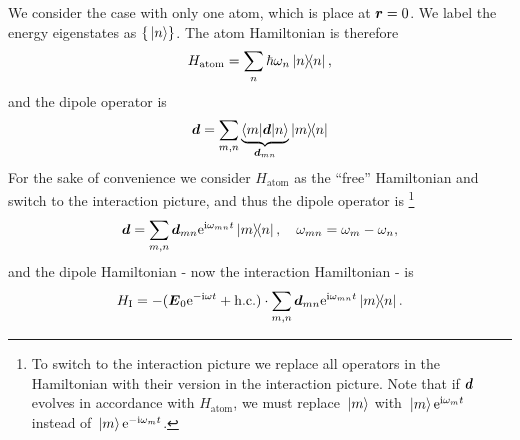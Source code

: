 \documentclass[hyperref, a4paper]{article}
\newcommand*{\ii}{\mathrm{i}}
\newcommand*{\ee}{\mathrm{e}}
\begin{document}
We consider the case with only one atom, which is place at $\vb*{r} = 0$.
We label the energy eigenstates as $\{\ket*{n}\}$. The atom Hamiltonian is therefore 
\begin{equation}
    H_\text{atom} = \sum_n \hbar \omega_n \dyad{n},
\end{equation}
and the dipole operator is 
\begin{equation}
    \vb*{d} = \sum_{m, n} \underbrace{\mel**{m}{\vb*{d}}{n}}_{\vb*{d}_{mn}} \dyad{m}{n}
\end{equation}
For the sake of convenience we consider $H_\text{atom}$ as the ``free'' Hamiltonian and switch to the interaction picture, and thus the dipole operator is%
\footnote{
    To switch to the interaction picture we replace all operators in the Hamiltonian with their version in the interaction picture.
    Note that if $\vb*{d}$ evolves in accordance with $H_\text{atom}$, we must replace $\ket*{m}$ with $\ket*{m} \ee^{\ii \omega_m t}$ instead of $\ket*{m} \ee^{-\ii \omega_m t}$.
}%
\begin{equation}
    \vb*{d} = \sum_{m, n} \vb*{d}_{mn} \ee^{\ii \omega_{mn} t} \dyad{m}{n}, \quad \omega_{mn} = \omega_m - \omega_n,
\end{equation}
and the dipole Hamiltonian - now the interaction Hamiltonian - is 
\begin{equation}
    H_\text{I} = - (\vb*{E}_0 \ee^{- \ii \omega t} + \text{h.c.}) \cdot \sum_{m, n} \vb*{d}_{mn} \ee^{\ii \omega_{mn} t} \dyad{m}{n}.
\end{equation}
\end{document}
